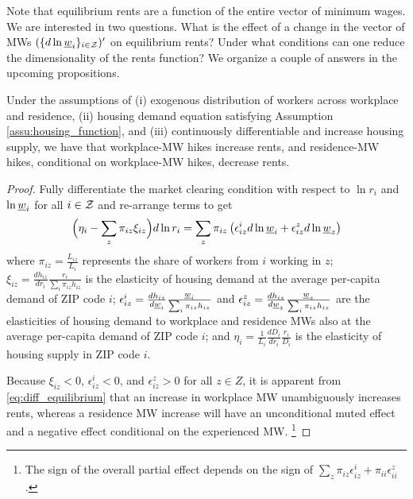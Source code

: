 Note that equilibrium rents are a function of the entire vector of minimum wages. 
We are interested in two questions. What is the effect of a change in the vector of 
MWs $(\{d \ln \underline{w}_i\}_{i\in\mathcal{Z}})'$ on equilibrium rents?
Under what conditions can one reduce the dimensionality of the rents function?
We organize a couple of answers in the upcoming propositions.

\begin{prop}\label{prop:comparative_statics}
    Under the assumptions of (i) exogenous distribution of workers across workplace 
    and residence, (ii) housing demand equation satisfying Assumption 
    \ref{assu:housing_function}, and (iii) continuously differentiable and increase 
    housing supply, we have that workplace-MW hikes increase rents, and residence-MW 
    hikes, conditional on workplace-MW hikes, decrease rents.
\end{prop}

\begin{proof}
    Fully differentiate the market clearing condition with respect to $\ln r_i$ and 
    $\ln \underline{w}_i$ for all $i\in\mathcal{Z}$ and re-arrange terms to get
    \begin{equation}\label{eq:diff_equilibrium}
        \Big(\eta_i - \sum_z \pi_{iz} \xi_{iz} \Big) d \ln r_i
        = 
        \sum_z \pi_{iz} \left(\epsilon_{iz}^i d \ln \underline{w}_i 
                            + \epsilon_{iz}^z d \ln \underline{w}_z \right)
    \end{equation}
    where 
    $\pi_{iz} = \frac{L_{iz}}{L_i}$ represents the share of workers from $i$ working 
    in	$z$;
    $\xi_{iz} = \frac{d h_{iz}}{d r_i} \frac{r_i}{\sum_i \pi_{iz} h_{iz}}$ is the 
    elasticity of housing demand at the average per-capita demand of ZIP code $i$;
    $\epsilon_{iz}^i = \frac{d h_{iz}}{d \underline{w}_i} \frac{\underline{w}_i}{\sum_i \pi_{iz} h_{iz}}$ and 
    $\epsilon_{iz}^z = \frac{d h_{iz}}{d \underline{w}_z} \frac{\underline{w}_z}{\sum_i \pi_{iz} h_{iz}}$ 
    are the elasticities of housing demand to workplace and residence MWs also at 
    the average per-capita demand of ZIP code $i$; and
    $\eta_i = \frac{1}{L_i} \frac{d D_i}{d r_i} \frac{r_i}{D_i}$ is the	elasticity 
    of housing supply in ZIP code $i$.

    Because $\xi_{iz} < 0$, $\epsilon_{iz}^i < 0$, and $\epsilon_{iz}^z > 0$ for 
    all $z\in Z$, it is apparent from \eqref{eq:diff_equilibrium} that an increase 
    in workplace MW unambiguously increases rents, whereas a residence MW increase 
    will have an unconditional muted effect
    and a negative effect conditional on the experienced MW.%
    \footnote{The sign of the overall partial effect depends on the sign of 
    $\sum_z \pi_{iz} \epsilon_{iz}^i + \pi_{ii} \epsilon_{ii}^z$.} 
\end{proof}

